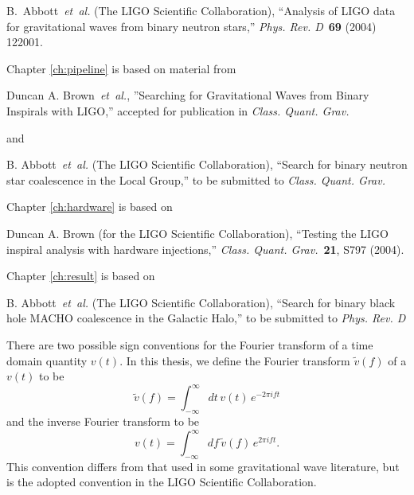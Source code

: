 \documentclass[12pt,notitlepage]{report}
\newcommand{\cqg}{{\it Class. Quant. Grav.}}
\newcommand{\prd}{{\it Phys. Rev. D}}
\begin{document}
\vspace*{0.25cm}

\noindent B.~Abbott~{\it et~al.} (The LIGO Scientific Collaboration),
``Analysis of LIGO data for gravitational waves from binary neutron stars,''
\prd~{\bf 69} (2004) 122001.

\vspace*{0.5cm}

\noindent Chapter \ref{ch:pipeline} is based on material from

\vspace*{0.25cm}

\noindent Duncan A. Brown~{\it et~al.}, ''Searching for Gravitational Waves
from Binary Inspirals with LIGO,'' accepted for publication in \cqg

\vspace*{0.25cm}

\noindent and

\vspace*{0.25cm}

\noindent B. Abbott~{\it et~al.} (The LIGO Scientific Collaboration), ``Search
for binary neutron star coalescence in the Local Group,'' to be submitted to
\cqg

\vspace*{0.5cm}

\noindent Chapter \ref{ch:hardware} is based on 

\vspace*{0.25cm}

\noindent Duncan A. Brown (for the LIGO Scientific Collaboration), ``Testing
the LIGO inspiral analysis with hardware injections,'' \cqg~{\bf 21}, S797
(2004).

\vspace*{0.5cm}

\noindent Chapter \ref{ch:result} is based on

\vspace*{0.25cm}

\noindent B. Abbott~{\it et~al.} (The LIGO Scientific Collaboration), ``Search
for binary black hole MACHO coalescence in the Galactic Halo,'' to be
submitted to \prd




There are two possible sign conventions for the Fourier transform of a time
domain quantity $v(t)$. In this thesis, we define the Fourier transform
$\tilde{v}(f)$ of a $v(t)$ to be
\begin{equation*}
\tilde{v}(f)=\int_{-\infty}^\infty dt\,v(t)\, e^{- 2 \pi i f t}
\end{equation*}
and the inverse Fourier transform to be 
\begin{equation*}
v(t)=\int_{-\infty}^\infty df\,\tilde{v}(f)\, e^{2 \pi i f t}.
\end{equation*}
This convention differs from that used in some gravitational wave literature,
but is the adopted convention in the LIGO Scientific Collaboration.
\end{document}
